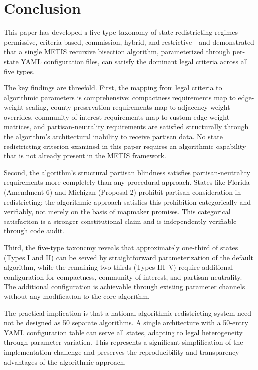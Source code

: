\section{Conclusion}
\label{sec:conclusion}

This paper has developed a five-type taxonomy of state redistricting regimes---permissive, criteria-based, commission, hybrid, and restrictive---and demonstrated that a single METIS recursive bisection algorithm, parameterized through per-state YAML configuration files, can satisfy the dominant legal criteria across all five types.

The key findings are threefold. First, the mapping from legal criteria to algorithmic parameters is comprehensive: compactness requirements map to edge-weight scaling, county-preservation requirements map to adjacency weight overrides, community-of-interest requirements map to custom edge-weight matrices, and partisan-neutrality requirements are satisfied structurally through the algorithm's architectural inability to receive partisan data. No state redistricting criterion examined in this paper requires an algorithmic capability that is not already present in the METIS framework.

Second, the algorithm's structural partisan blindness satisfies partisan-neutrality requirements more completely than any procedural approach. States like Florida (Amendment 6) and Michigan (Proposal 2) prohibit partisan consideration in redistricting; the algorithmic approach satisfies this prohibition categorically and verifiably, not merely on the basis of mapmaker promises. This categorical satisfaction is a stronger constitutional claim and is independently verifiable through code audit.

Third, the five-type taxonomy reveals that approximately one-third of states (Types I and II) can be served by straightforward parameterization of the default algorithm, while the remaining two-thirds (Types III--V) require additional configuration for compactness, community of interest, and partisan neutrality. The additional configuration is achievable through existing parameter channels without any modification to the core algorithm.

The practical implication is that a national algorithmic redistricting system need not be designed as 50 separate algorithms. A single architecture with a 50-entry YAML configuration table can serve all states, adapting to legal heterogeneity through parameter variation. This represents a significant simplification of the implementation challenge and preserves the reproducibility and transparency advantages of the algorithmic approach.

